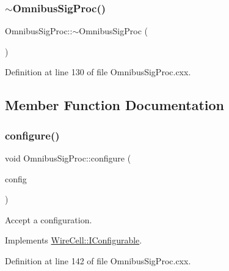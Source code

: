 \subsubsection{\texorpdfstring{$\sim$\+Omnibus\+Sig\+Proc()}{~OmnibusSigProc()}}
{\footnotesize\ttfamily Omnibus\+Sig\+Proc\+::$\sim$\+Omnibus\+Sig\+Proc (\begin{DoxyParamCaption}{ }\end{DoxyParamCaption})\hspace{0.3cm}{\ttfamily [virtual]}}



Definition at line 130 of file Omnibus\+Sig\+Proc.\+cxx.



\subsection{Member Function Documentation}
\mbox{\label{class_wire_cell_1_1_sig_proc_1_1_omnibus_sig_proc_ae275bf0ab16567d97df2cfcef76e1bdc}} 
\subsubsection{\texorpdfstring{configure()}{configure()}}
{\footnotesize\ttfamily void Omnibus\+Sig\+Proc\+::configure (\begin{DoxyParamCaption}\item[{const \hyperlink{namespace_wire_cell_a9f705541fc1d46c608b3d32c182333ee}{Wire\+Cell\+::\+Configuration} \&}]{config }\end{DoxyParamCaption})\hspace{0.3cm}{\ttfamily [virtual]}}



Accept a configuration. 



Implements \hyperlink{class_wire_cell_1_1_i_configurable_a57ff687923a724093df3de59c6ff237d}{Wire\+Cell\+::\+I\+Configurable}.



Definition at line 142 of file Omnibus\+Sig\+Proc.\+cxx.

\mbox{\label{class_wire_cell_1_1_sig_proc_1_1_omnibus_sig_proc_a2184e1c75923be1dfd36fc848cc00785}} 
